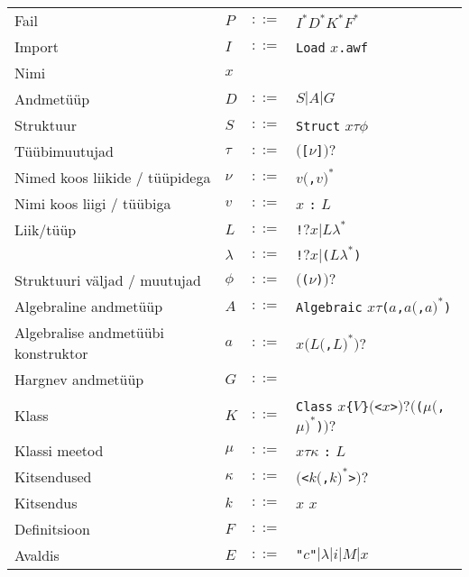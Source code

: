 \documentclass[12pt]{article}
\begin{document}
    \begin{tabular}{llll}
      Fail & $P$ & $::=$ & $I^*D^*K^*F^*$ \\
      Import & $I$ & $::=$ & {\color{hall}\verb!Load!} $x${\color{hall}\verb!.awf!} \\
      Nimi & $x$ &  &  \\
      Andmetüüp & $D$ & $::=$ & $S|A|G$ \\
      Struktuur & $S$ & $::=$ & {\color{hall}\verb!Struct!} $x\tau\phi$ \\
      Tüübimuutujad & $\tau$ & $::=$ & $(${\color{hall}\verb![!}$\nu${\color{hall}\verb!]!}$)?$ \\
      Nimed koos liikide / tüüpidega & $\nu$ & $::=$ & $v(${\color{hall}\verb!,!}$v)^*$ \\
      Nimi koos liigi / tüübiga & $v$ & $::=$ & $x$ {\color{hall}\verb!:!} $L$ \\
      Liik/tüüp & $L$ & $::=$ & {\color{hall}\verb"!"}$?x|L\lambda^*$ \\
       & $\lambda$ & $::=$ & {\color{hall}\verb"!"}$?x|${\color{hall}\verb!(!}$L\lambda^*${\color{hall}\verb!)!} \\
      Struktuuri väljad / muutujad & $\phi$ & $::=$ & $(${\color{hall}\verb!(!}$\nu${\color{hall}\verb!)!}$)?$ \\
      Algebraline andmetüüp & $A$ & $::=$ & {\color{hall}\verb!Algebraic!} $x\tau${\color{hall}\verb!(!}$a${\color{hall}\verb!,!}$a(${\color{hall}\verb!,!}$a)^*${\color{hall}\verb!)!} \\
      Algebralise andmetüübi konstruktor & $a$ & $::=$ & $x(L(${\color{hall}\verb!,!}$L)^*)?$ \\
      Hargnev andmetüüp & $G$ & $::=$ &  \\
      Klass & $K$ & $::=$ & {\color{hall}\verb!Class!} $x${\color{hall}\verb!{!}$V${\color{hall}\verb!}!}$(${\color{hall}\verb!<!}$x${\color{hall}\verb!>!}$)?(${\color{hall}\verb!(!}$\mu(${\color{hall}\verb!,!}$\mu)^*${\color{hall}\verb!)!}$)?$ \\
      Klassi meetod & $\mu$ & $::=$ & $x\tau\kappa$ {\color{hall}\verb!:!} $L$ \\
      Kitsendused & $\kappa$ & $::=$ & $(${\color{hall}\verb!<!}$k(${\color{hall}\verb!,!}$k)^*${\color{hall}\verb!>!}$)?$ \\
      Kitsendus & $k$ & $::=$ & $x$ $x$ \\
      Definitsioon & $F$ & $::=$ &  \\
      Avaldis & $E$ & $::=$ & {\color{hall}\verb!"!}$c${\color{hall}\verb!"!}$|\lambda|i|M|x$ \\

\end{tabular}
\end{document}

